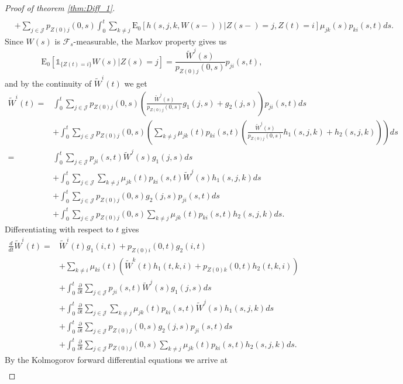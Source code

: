 \documentclass[12pt]{article}
\newcommand{\E}{\text{E}}
\newcommand{\indic}[1]{\mathds{1}_{ \{ #1 \} }}
\theoremstyle{my_thm}
\begin{document}
\begin{proof}[Proof of theorem \ref{thm:Diff_1}]
\begin{align*}
\\
&+
\sum_{j \in \mathcal{J}} p_{Z(0)j}(0,s)  \int_0^t \sum_{k \neq j }   \E_0 \left[ h(s,j,k,W(s-))  |Z(s-)=j,Z(t)=i \right] \mu_{jk}(s)p_{ki}(s,t) ds.
\end{align*}
Since $W(s)$ is $\mathcal{F}_s$-measurable, the Markov property gives us
$$
\E_0[\indic{Z(t)=i}W(s)|Z(s)=j]=\frac{\tilde{W}^j(s)}{p_{Z(0)j}(0,s)}p_{ji}(s,t), 
$$
and by the continuity of $\tilde{W}^i(t)$ we get
\begin{align*}
\tilde{W}^i(t)=&
\int_0^t \sum_{j \in \mathcal{J}} p_{Z(0)j}(0,s)\left( \frac{\tilde{W}^j(s)}{p_{Z(0)j}(0,s)}g_1(j,s)+g_2(j,s)\right)p_{ji}(s,t) ds
\\
&+
\int_0^t \sum_{j \in \mathcal{J}} p_{Z(0)j}(0,s)  \left( \sum_{k \neq j}  \mu_{jk}(t)p_{ki}(s,t) \left(  \frac{\tilde{W}^j(s)}{p_{Z(0)j}(0,s)} h_1(s,j,k)+h_2(s,j,k)  \right) \right) ds
\\
=&
\int_0^t \sum_{j \in \mathcal{J}} p_{ji}(s,t) \tilde{W}^j(s)g_1(j,s) ds
\\
&+
\int_0^t \sum_{j \in \mathcal{J}} \sum_{k \neq j}  \mu_{jk}(t) p_{ki}(s,t) \tilde{W}^j(s) h_1(s,j,k)  ds
\\
&+
\int_0^t \sum_{j \in \mathcal{J}} p_{Z(0)j}(0,s)g_2(j,s)p_{ji}(s,t) ds
\\
&+
\int_0^t \sum_{j \in \mathcal{J}} p_{Z(0)j}(0,s)  \sum_{k \neq j}  \mu_{jk}(t) p_{ki}(s,t)h_2(s,j,k) ds.
\end{align*}
Differentiating with respect to $t$ gives
\begin{align*}
\frac{d}{dt}\tilde{W}^i(t)=&
 \tilde{W}^i(t)g_1(i,t)+p_{Z(0)i}(0,t)g_2(i,t)\\
&+
\sum_{k \neq i} \mu_{ki}(t) \left( \tilde{W}^k(t) h_1(t,k,i) + p_{Z(0)k}(0,t)h_2(t,k,i) \right)
\\
&+
\int_0^t \frac{\partial}{\partial t}  \sum_{j \in \mathcal{J}} p_{ji}(s,t) \tilde{W}^j(s)g_1(j,s) ds
\\
&+
\int_0^t \frac{\partial}{\partial t}  \sum_{j \in \mathcal{J}} \sum_{k \neq j}  \mu_{jk}(t) p_{ki}(s,t) \tilde{W}^j(s) h_1(s,j,k)  ds
\\
&+
\int_0^t \frac{\partial}{\partial t}  \sum_{j \in \mathcal{J}} p_{Z(0)j}(0,s)g_2(j,s)p_{ji}(s,t) ds
\\
&+
\int_0^t \frac{\partial}{\partial t} \sum_{j \in \mathcal{J}} p_{Z(0)j}(0,s)  \sum_{k \neq j}  \mu_{jk}(t) p_{ki}(s,t)h_2(s,j,k) ds.
\end{align*}
By the Kolmogorov forward differential equations we arrive at
\begin{align*}

\end{align*}
\end{proof}
\end{document}
